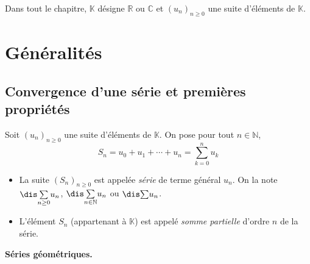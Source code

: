 \documentclass[a4paper,10pt]{report}
\newcommand{\Sum}[2]{\ensuremath{\textstyle{\sum\limits_{#1}^{#2}}}}
\begin{document}
\everymath{\displaystyle}


\noindent Dans tout le chapitre, $\mathbb{K}$ désigne $\mathbb{R}$ ou $\mathbb{C}$ et $(u_n)_{n \geq 0}$ une suite d'éléments de $\mathbb{K}$.

\section{Généralités}
\subsection{Convergence d'une série et premières propriétés}
\begin{defin}
Soit $(u_n)_{n \geq 0}$ une suite d'éléments de $\mathbb{K}$. On pose pour tout $n \in \mathbb{N}$,
$$ S_n =  u_0 + u_1 + \cdots + u_n = \sum_{k=0}^n u_k $$

\begin{itemize}
\item La suite $(S_n)_{n \geq 0}$ est appelée \textit{série} de terme général $u_n$. On la note $\dis \Sum{n \geq 0}{} u_n$, $\dis \Sum{n \in \mathbb{N}}{} u_n$ ou $\dis \Sum{}{} u_n$.
\item L'élément $S_n$ (appartenant à $\mathbb{K}$) est appelé \textit{somme partielle} d'ordre $n$ de la série.
\end{itemize}
\end{defin}

\begin{ex} \textbf{Séries géométriques.}

%
%

\vspace{5cm}
\end{ex}
\end{document}
